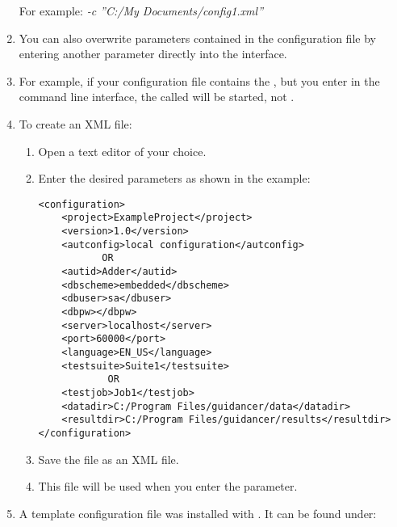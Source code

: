 \begin{enumerate}
For example:
\emph{-c ''C:/My Documents/config1.xml''}
\item You can also overwrite parameters contained in the configuration file by entering another parameter directly into the interface. 
\item For example, if your configuration file contains the \gdsuite{} , but you enter  in the command line interface, the \gdsuite{} called  will be started, not .
\item To create an XML file:
\begin{enumerate} 
\item Open a text editor of your choice. 
\item Enter the desired parameters as shown in the example:
\footnotesize
\begin{verbatim}
<configuration>
    <project>ExampleProject</project>
    <version>1.0</version>
    <autconfig>local configuration</autconfig>
           OR
    <autid>Adder</autid>
    <dbscheme>embedded</dbscheme>
    <dbuser>sa</dbuser>
    <dbpw></dbpw>
    <server>localhost</server>
    <port>60000</port>
    <language>EN_US</language>
    <testsuite>Suite1</testsuite>
            OR
    <testjob>Job1</testjob>        
    <datadir>C:/Program Files/guidancer/data</datadir>
    <resultdir>C:/Program Files/guidancer/results</resultdir>
</configuration>
\end{verbatim}
\normalsize
\item Save the file as an XML file.
\item This file will be used when you enter the  parameter.
\end{enumerate}
\item A template configuration file was installed with \app{}. It can be found under:\\
\end{enumerate}

